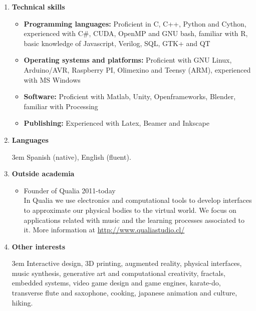 \documentclass[letterpaper,11pt]{article}
\newcommand{\compactlist}{\setlength{\parskip}{0pt} \setlength{\leftskip}{2em}}
\begin{document}
\begin{enumerate}[I]
	\item \textbf{Technical skills}
		\begin{itemize} \compactlist
			\item \textbf{Programming languages:} Proficient in C, C++,  Python and Cython, experienced with C\#, CUDA, OpenMP and GNU bash, familiar with R, basic knowledge of Javascript, Verilog, SQL, GTK+ and QT
			\item \textbf{Operating systems and platforms:} Proficient with GNU Linux, Arduino/AVR, Raspberry PI, Olimexino and Teensy (ARM), experienced with MS Windows 
			\item \textbf{Software:} Proficient with Matlab, Unity, Openframeworks, Blender, familiar with Processing
			\item \textbf{Publishing:} Experienced with Latex, Beamer and Inkscape
		\end{itemize}
        
	
	\item \textbf{Languages} 
	
	{\leftskip 3em  Spanish (native), English (fluent). \par }
	
	\newpage
	
	\item \textbf{Outside academia}
		\begin{itemize}  \compactlist
		\item Founder of Qualia \hfill2011-today \\
		In Qualia we use electronics and computational tools to develop interfaces to approximate our physical bodies to the virtual world. We focus on applications related with music and the learning processes associated to it. More information at \url{http://www.qualiastudio.cl/}
		\end{itemize}
		
	\item \textbf{Other interests} 
	
	{\leftskip 3em Interactive design, 3D printing, augmented reality, physical interfaces, music synthesis, generative art and computational creativity,  fractals, embedded systems, video game design and game engines, karate-do, transverse flute and saxophone, cooking, japanese animation and culture, hiking.  \par }

	
\end{enumerate}
\end{document}
